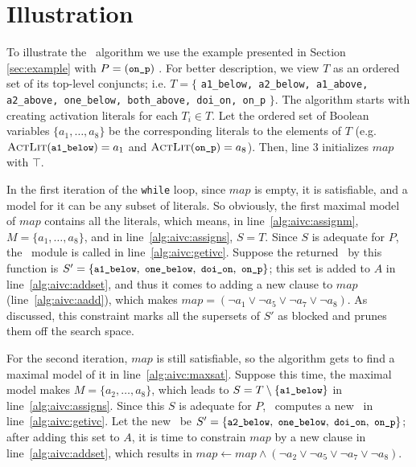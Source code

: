 \section{Illustration}
\label{sec:illust}
To illustrate the \aivcalg ~algorithm we use the example presented in Section \ref{sec:example} with $P = (\small{\texttt{on\_p}})$ .
For better description, we view $T$ as an ordered set of its top-level conjuncts; i.e. $T = \{$ {\small \texttt{a1\_below, a2\_below, a1\_above, a2\_above, one\_below, both\_above, doi\_on, on\_p}} $\}$.
The algorithm starts with creating activation literals for each $T_i \in T$. Let the ordered set of Boolean variables $\{ a_1, \ldots , a_8 \}$ be the corresponding literals to the elements of $T$ (e.g. $\actlit (\small{\texttt{a1\_below}}) = a_1$ and $\actlit (\small{\texttt{on\_p}}) = a_8$). Then, line 3 initializes $map$ with $\top$.

In the first iteration of the \texttt{while} loop, since $map$ is
empty, it is satisfiable, and a model for it can be any subset of
literals. So obviously, the first maximal model of $map$ contains all
the literals, which means, in line~\ref{alg:aivc:assignm}, $M = \{a_1,
\ldots, a_8\}$, and in line~\ref{alg:aivc:assigns}, $S = T$. Since $S$
is adequate for $P$, the \getivc ~module is called in
line~\ref{alg:aivc:getivc}. Suppose the returned \mivc\ by this function
is $S' = \{ \small{ \texttt{a1\_below},~\texttt{one\_below},
  ~\texttt{doi\_on},~\texttt{on\_p}}\}$; this set is added to $A$ in
line~\ref{alg:aivc:addset}, and thus it comes to adding a new clause
to $map$ (line~\ref{alg:aivc:aadd}), which makes $map = (\neg a_1 \vee
\neg a_5 \vee \neg a_7 \vee \neg a_8)$. As discussed, this constraint
marks all the supersets of $S'$ as blocked and prunes them off the
search space.

For the second iteration, $map$ is still satisfiable,
so the algorithm gets to find a maximal model of it in line~\ref{alg:aivc:maxsat}. Suppose this time, the maximal model makes $M = \{a_2, \ldots, a_8\}$,
which leads to $S = T \setminus \{\small{\texttt{a1\_below}}\} $ in line~\ref{alg:aivc:assigns}.
Since this $S$ is adequate for $P$, \getivc ~computes a new \mivc\ in line~\ref{alg:aivc:getivc}.
Let the new \mivc\ be $S' = \{ \small{ \texttt{a2\_below},~\texttt{one\_below}, ~\texttt{doi\_on},~\texttt{on\_p}}\}$; after adding this set to $A$,
it is time to constrain $map$ by a new clause in line~\ref{alg:aivc:addset},
which results in $map \leftarrow map \wedge (\neg a_2 \vee \neg a_5 \vee \neg a_7 \vee \neg a_8)$.

